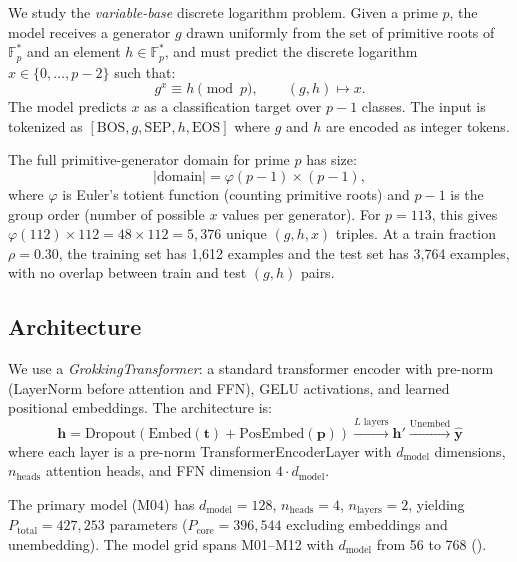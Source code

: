 \documentclass[twoside,11pt]{article}
\newcommand{\Fps}{\mathbb{F}_p^*}
\newcommand{\Pcore}{P_{\mathrm{core}}}
\newcommand{\Ptotal}{P_{\mathrm{total}}}
\newcommand{\dmodel}{d_{\mathrm{model}}}
\newcommand{\nheads}{n_{\mathrm{heads}}}
\newcommand{\nlayers}{n_{\mathrm{layers}}}
\begin{document}
We study the \emph{variable-base} discrete logarithm problem. Given a prime $p$, the model receives a generator $g$ drawn uniformly from the set of primitive roots of $\Fps$ and an element $h \in \Fps$, and must predict the discrete logarithm $x \in \{0, \ldots, p-2\}$ such that:
\begin{equation}
    g^x \equiv h \pmod{p}, \qquad (g, h) \mapsto x.
\end{equation}
The model predicts $x$ as a classification target over $p - 1$ classes. The input is tokenized as $[\mathrm{BOS}, g, \mathrm{SEP}, h, \mathrm{EOS}]$ where $g$ and $h$ are encoded as integer tokens.

The full primitive-generator domain for prime $p$ has size:
\begin{equation}
    |\text{domain}| = \varphi(p-1) \times (p - 1),
\end{equation}
where $\varphi$ is Euler's totient function (counting primitive roots) and $p - 1$ is the group order (number of possible $x$ values per generator). For $p = 113$, this gives $\varphi(112) \times 112 = 48 \times 112 = 5{,}376$ unique $(g, h, x)$ triples. At a train fraction $\rho = 0.30$, the training set has 1,612 examples and the test set has 3,764 examples, with no overlap between train and test $(g, h)$ pairs.

\subsection{Architecture}

We use a \emph{GrokkingTransformer}: a standard transformer encoder with pre-norm (LayerNorm before attention and FFN), GELU activations, and learned positional embeddings. The architecture is:
\begin{equation}
    \mathbf{h} = \mathrm{Dropout}(\mathrm{Embed}(\mathbf{t}) + \mathrm{PosEmbed}(\mathbf{p}))
    \xrightarrow{\text{$L$ layers}} \mathbf{h}'
    \xrightarrow{\text{Unembed}} \hat{\mathbf{y}}
\end{equation}
where each layer is a pre-norm TransformerEncoderLayer \citep{vaswani2017attention} with $\dmodel$ dimensions, $\nheads$ attention heads, and FFN dimension $4 \cdot \dmodel$.

The primary model (M04) has $\dmodel = 128$, $\nheads = 4$, $\nlayers = 2$, yielding $\Ptotal = 427{,}253$ parameters ($\Pcore = 396{,}544$ excluding embeddings and unembedding). The model grid spans M01--M12 with $\dmodel$ from 56 to 768 ().
\end{document}

